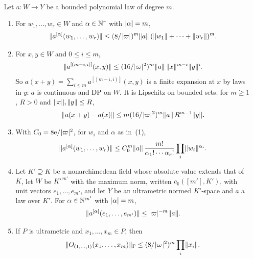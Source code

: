 \begin{lemma}\label{amb:lem:mixed}
Let $a\colon W\to Y$ be a bounded polynomial law of degree $m$.
\begin{enumerate}
\item For $w_1,\dots,w_r\in W$ and $\alpha\in\mathbb N^r$ with $\lvert \alpha\rvert=m$,
\begin{equation}\label{amb:eq:mixed-sum}
 \lVert a^{[\alpha]}(w_1,\dots,w_r)\rVert\le(8/\lvert \varpi\rvert)^m\lVert a\rVert\,(\lVert w_1\rVert+\dots+\lVert w_r\rVert)^m.
\end{equation}
\item For $x,y\in W$ and $0\le i\le m$,
\begin{equation}\label{amb:eq:binomial}
 \lVert a^{[(m-i,i)]}(x,y)\rVert\le(16/\lvert \varpi\rvert^2)^m\lVert a\rVert\,\lVert x\rVert^{m-i}\lVert y\rVert^i.
\end{equation}
So $a(x+y)=\sum_{i\le m}a^{[(m-i,i)]}(x,y)$ is a finite expansion at $x$ by laws in $y$: $a$ is continuous and DP on $W$. It is Lipschitz on bounded sets: for $m\ge1$, $R>0$ and $\lVert x\rVert,\lVert y\rVert\le R$,
\begin{equation}\label{amb:eq:lipschitz}
 \lVert a(x+y)-a(x)\rVert\le m(16/\lvert \varpi\rvert^2)^m\lVert a\rVert\,R^{m-1}\lVert y\rVert.
\end{equation}
\item With $C_0=8\mathrm e/\lvert \varpi\rvert^2$, for $w_i$ and $\alpha$ as in~(1),
\begin{equation}\label{amb:eq:multinomial}
 \lVert a^{[\alpha]}(w_1,\dots,w_r)\rVert\le C_0^m\lVert a\rVert\,\frac{m!}{\alpha_1!\cdots\alpha_r!}\prod_i\lVert w_i\rVert^{\alpha_i}.
\end{equation}
\item Let $K'\supseteq K$ be a nonarchimedean field whose absolute value extends that of $K$, let $W$ be $K'^{\,m'}$ with the maximum norm, written $c_0([m'],K')$, with unit vectors $e_1,\dots,e_{m'}$, and let $Y$ be an ultrametric normed $K'$\nobreakdash-space and $a$ a law over $K'$. For $\alpha\in\mathbb N^{m'}$ with $\lvert \alpha\rvert=m$,
\begin{equation}\label{amb:eq:node}
 \lVert a^{[\alpha]}(e_1,\dots,e_{m'})\rVert\le\lvert \varpi\rvert^{-m}\lVert a\rVert.
\end{equation}
\item If $P$ is ultrametric and $x_1,\dots,x_m\in P$, then
\begin{equation}\label{amb:eq:sym}
 \lVert O_{(1,\dots,1)}(x_1,\dots,x_m)\rVert_\Gamma\le(8/\lvert \varpi\rvert^2)^m\prod_i\lVert x_i\rVert.
\end{equation}
\end{enumerate}
\end{lemma}

